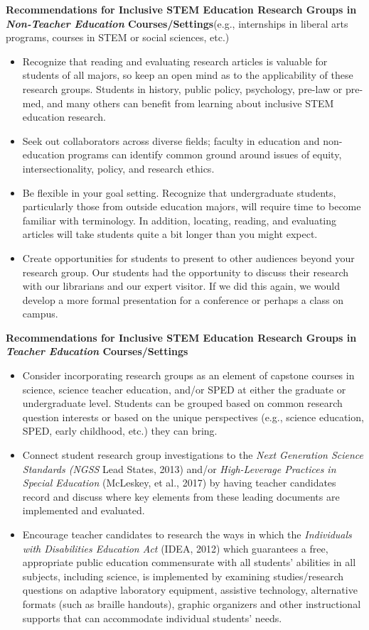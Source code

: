 \documentclass[11.5pt]{sig-alternate}
\begin{document}
\begin{large}
\textbf{Recommendations for Inclusive STEM Education Research Groups in \textit{Non-Teacher Education} Courses/Settings}(e.g., internships in liberal arts programs, courses in STEM or social sciences, etc.)
\begin{itemize}
    \item Recognize that reading and evaluating research articles is valuable for students of all majors, so keep an open mind as to the applicability of these research groups.  Students in history, public policy, psychology, pre-law or pre-med, and many others can benefit from learning about inclusive STEM education research.
    \item Seek out collaborators across diverse fields; faculty in education and non-education programs can identify common ground around issues of equity, intersectionality, policy, and research ethics.
    \item Be flexible in your goal setting. Recognize that undergraduate students, particularly those from outside education majors, will require time to become familiar with terminology.  In addition, locating, reading, and evaluating articles will take students quite a bit longer than you might expect.
    \item Create opportunities for students to present to other audiences beyond your research group. Our students had the opportunity to discuss their research with our librarians and our expert visitor.  If we did this again, we would develop a more formal presentation for a conference or perhaps a class on campus.
\end{itemize}
\textbf{Recommendations for Inclusive STEM Education Research Groups in \textit{Teacher Education} Courses/Settings}
 \begin{itemize}
     \item Consider incorporating research groups as an element of capstone courses in science, science teacher education, and/or SPED at either the graduate or undergraduate level.  Students can be grouped based on common research question interests or based on the unique perspectives (e.g., science education, SPED, early childhood, etc.) they can bring.
     \item Connect student research group investigations to the \textit{Next Generation Science Standards (NGSS} Lead States, 2013) and/or \textit{High-Leverage Practices in Special Education} (McLeskey, et al., 2017) by having teacher candidates record and discuss where key elements from these leading documents are implemented and evaluated.
     \item Encourage teacher candidates to research the ways in which the \textit{Individuals with Disabilities Education Act} (IDEA, 2012) which guarantees a free, appropriate public education commensurate with all students’ abilities in all subjects, including science, is implemented by examining studies/research questions on adaptive laboratory equipment, assistive technology, alternative formats (such as braille handouts), graphic organizers and other instructional supports that can accommodate individual students’ needs.

\end{itemize}
\end{large}
\end{document}
